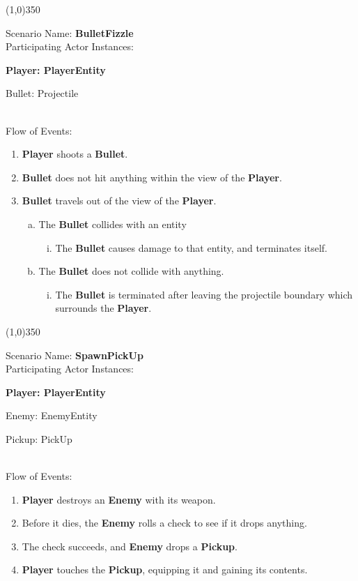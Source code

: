\documentclass[12pt]{article}       %
\begin{document}
\begin{center} \line(1,0){350} \end{center}
Scenario Name: {\bf BulletFizzle} \\
Participating Actor Instances:        \hspace{46pt} {\bf Player: PlayerEntity

					          \hspace{2.6 in}   Bullet: Projectile}  \vspace{10pt}  \\ 
Flow of Events: 
\begin{enumerate} 
\item {\bf Player} shoots a {\bf Bullet}.
\item {\bf Bullet} does not hit anything within the view of the {\bf Player}.
\item {\bf Bullet} travels out of the view of the {\bf Player}.
      \begin{enumerate}[a.]
       \item The {\bf Bullet} collides with an entity
                \begin{enumerate}[i.]
                \item The {\bf Bullet} causes damage to that entity, and terminates itself.
                \end{enumerate}
      \item The {\bf Bullet} does not collide with anything.
                \begin{enumerate}[i.]
                \item The {\bf Bullet} is terminated after leaving the projectile boundary which surrounds the {\bf Player}.
                \end{enumerate}
        \end{enumerate}
\end{enumerate}

\begin{center} \line(1,0){350} \end{center}
Scenario Name: {\bf SpawnPickUp} \\
Participating Actor Instances:        \hspace{46pt} {\bf Player: PlayerEntity
	
						\hspace{2.6 in} Enemy: EnemyEntity

					          \hspace{2.6 in}  Pickup: PickUp}  \vspace{10pt}  \\ 
Flow of Events: 
\begin{enumerate} 
\item {\bf Player} destroys an {\bf Enemy} with its weapon.
\item Before it dies, the {\bf Enemy} rolls a check to see if it drops anything.
\item The check succeeds, and {\bf Enemy} drops a {\bf Pickup}.
\item {\bf Player} touches the {\bf Pickup}, equipping it and gaining its contents.
\end{enumerate}
\end{document}
